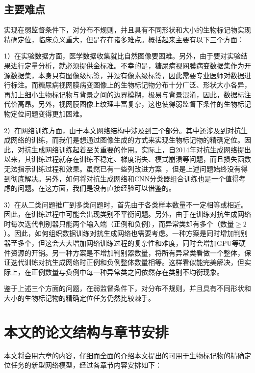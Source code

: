 \subsection{主要难点}\label{sec:difficulties}
实现在弱监督条件下，对分布不规则，并且具有不同形状和大小的生物标记物实现精确定位，临床意义重大，但是存在诸多难点。概括起来主要有以下三个方面：

1）在实验数据方面，医学数据收集就比自然图像要困难。另外，由于要对实验结果进行定量分析，就必须提供金标准。不幸的是，糖尿病视网膜病变数据集作为开源数据集，本身只有图像级标签，并没有像素级标签，因此需要专业医师对数据进行标注。而糖尿病视网膜病变图像上的生物标记物分布十分广泛、形状大小各异，再加上细小生物标记物与背景之间的边界模糊，极易与背景混淆，因此，数据标注代价高昂。另外，视网膜图像上纹理丰富复杂，这也使得弱监督下条件的生物标记物定位问题变得更加困难。

2）在网络训练方面，由于本文网络结构中涉及到三个部分。其中还涉及到对抗生成网络的训练，而我们是想通过图像生成的方式来实现生物标记物的精确定位。因此，对抗生成网络训练起着至关重要的作用。实际上，自2014年对抗生成网络提出以来，其训练过程就存在训练不稳定、梯度消失、模式崩溃等问题，而且损失函数无法指示训练过程和效果。虽然已有一些列改进方案~\cite{mirza2014conditional, radford2015unsupervised, arjovsky2017wasserstein, gulrajani2017improved, mao2017least}，但是上述问题始终没有得到彻底解决。另外，如何将对抗生成网络和CNN分类器组合训练也是一个值得考虑的问题。在这方面，我们是没有直接经验可以借鉴的。

3）在从二类问题推广到多类问题时，首先由于各类样本数量不一定相等或相近。因此，在训练过程中可能会出现类别不平衡问题。另外，由于在训练对抗生成网络时每次迭代判别器只能两个输入端（正例和负例），而异常类却有多个（数量$\geq 2$）。因此，如何组织数据训练对抗生成网络也需要考虑。一种方案是同时增加判别器至多个，但这会大大增加网络训练过程的复杂性和难度，同时会增加GPU等硬件资源的开销。另一种方案是不增加判别器数量，将所有异常类看做一个整体，保证迭代训练对抗生成网络时正例和负例整体数量相等。这样看似能完美解决，但实际上，在正例数量与负例中每一种异常类之间依然存在类别不均衡现象。

鉴于上述三个方面的问题，在弱监督条件下，对分布不规则，并且具有不同形状和大小的生物标记物的精确定位任务仍然比较棘手。

\section{本文的论文结构与章节安排}\label{sec:arrangement}
本文将会用六章的内容，仔细而全面的介绍本文提出的可用于生物标记物的精确定位任务的新型网络模型，经过各章节内容安排如下：

